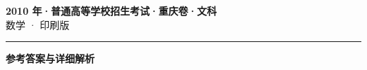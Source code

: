 \documentclass[zihao=5, a4paper]{ctexart}
\begin{document}
\begin{center}
  {\Large\bfseries 2010 年·普通高等学校招生考试·重庆卷·文科}\\[4pt]
  {\large 数学 · 印刷版}
\end{center}
\medskip
{}

\par\bigskip\hrule\bigskip
{}
\begin{center}{\large\bfseries 参考答案与详细解析}\end{center}
\smallskip

\end{document}
